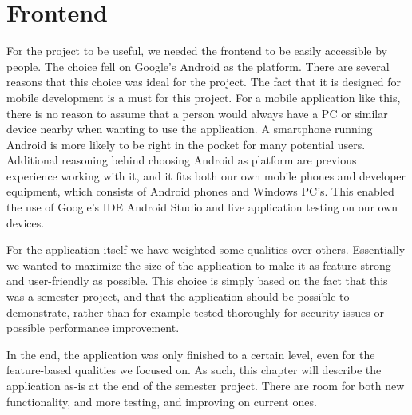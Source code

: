 \chapter{Frontend}
\label{chap:frontend}

For the project to be useful, we needed the frontend to be easily accessible by people. The choice fell on Google's Android as the platform. There are several reasons that this choice was ideal for the project. The fact that it is designed for mobile development is a must for this project. For a mobile application like this, there is no reason to assume that a person would always have a PC or similar device nearby when wanting to use the application. A smartphone running Android is more likely to be right in the pocket for many potential users. Additional reasoning behind choosing Android as platform are previous experience working with it, and it fits both our own mobile phones and developer equipment, which consists of Android phones and Windows PC's. This enabled the use of Google's IDE Android Studio and live application testing on our own devices.

For the application itself we have weighted some qualities over others. Essentially we wanted to maximize the size of the application to make it as feature-strong and user-friendly as possible. This choice is simply based on the fact that this was a semester project, and that the application should be possible to demonstrate, rather than for example tested thoroughly for security issues or possible performance improvement.

In the end, the application was only finished to a certain level, even for the feature-based qualities we focused on. As such, this chapter will describe the application as-is at the end of the semester project. There are room for both new functionality, and more testing, and improving on current ones.
 



